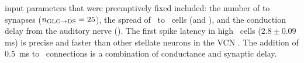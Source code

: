 \DS input parameters that were preemptively fixed included: the number of \GLG to \DS synapses ($\protect n_{\protect\textrm{{GLG}}\to\textrm{{DS}}} = 25$), the spread of \ANFs~to \DS~cells (\sANFDSh and \sANFDSl), and the conduction delay from the auditory nerve (\dANFDS).
The first spike latency in high \CF \DS~cells ($2.8 \pm 0.09$ ms) is precise and faster than other stellate neurons in the VCN \citep{RhodeSmith:1986}.
The addition of 0.5~ms to \ANFDS~connections is a combination of conductance and synaptic delay.




